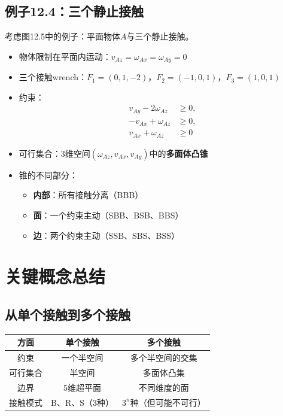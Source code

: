 \documentclass[12pt,a4paper]{article}
\begin{document}
\subsection{例子12.4：三个静止接触}

考虑图12.5中的例子：平面物体$A$与三个静止接触。

\begin{itemize}
\item 物体限制在平面内运动：$v_{Az} = \omega_{Ax} = \omega_{Ay} = 0$
\item 三个接触wrench：$F_1 = (0, 1, -2)$，$F_2 = (-1, 0, 1)$，$F_3 = (1, 0, 1)$
\item 约束：
  \begin{align}
  v_{Ay} - 2\omega_{Az} &\geq 0, \\
  -v_{Ax} + \omega_{Az} &\geq 0, \\
  v_{Ax} + \omega_{Az} &\geq 0
  \end{align}
\item 可行集合：3维空间$(\omega_{Az}, v_{Ax}, v_{Ay})$中的\textbf{多面体凸锥}
\item 锥的不同部分：
  \begin{itemize}
  \item \textbf{内部}：所有接触分离（BBB）
  \item \textbf{面}：一个约束主动（SBB、BSB、BBS）
  \item \textbf{边}：两个约束主动（SSB、SBS、BSS）
  \end{itemize}
\end{itemize}

\section{关键概念总结}

\subsection{从单个接触到多个接触}

\begin{center}
\begin{tabular}{|c|c|c|}
\hline
\textbf{方面} & \textbf{单个接触} & \textbf{多个接触} \\
\hline
约束 & 一个半空间 & 多个半空间的交集 \\
\hline
可行集合 & 半空间 & 多面体凸集 \\
\hline
边界 & 5维超平面 & 不同维度的面 \\
\hline
接触模式 & B、R、S（3种） & $3^n$种（但可能不可行） \\
\hline
\end{tabular}
\end{center}
\end{document}
